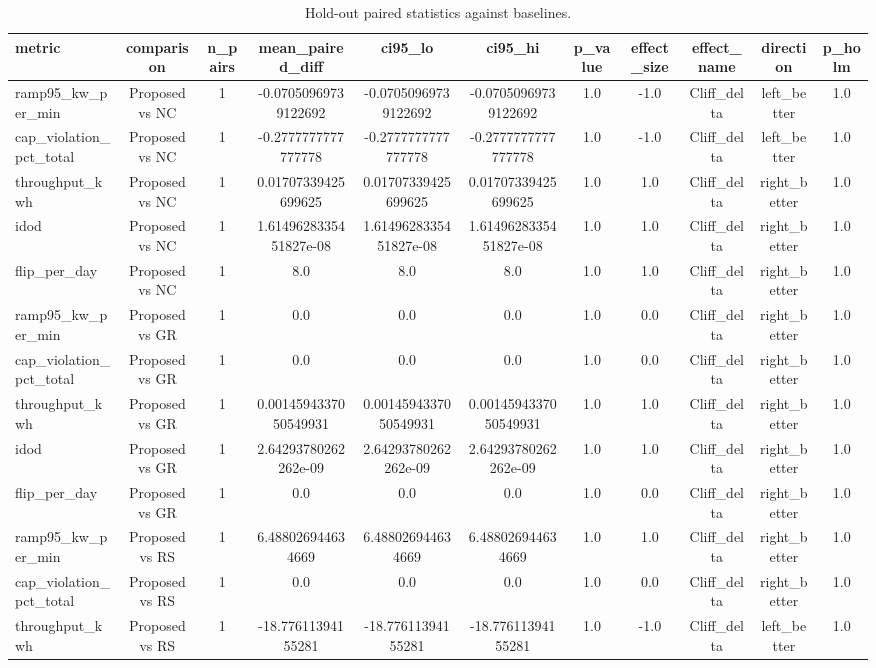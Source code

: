 \begin{table}[t]
\centering
\caption{Hold-out paired statistics against baselines.}
\label{tab:holdout_stats_auto}
\begin{tabular}{lcccccccccc}
\toprule
metric & comparison & n\_pairs & mean\_paired\_diff & ci95\_lo & ci95\_hi & p\_value & effect\_size & effect\_name & direction & p\_holm \\
\midrule
ramp95\_kw\_per\_min & Proposed vs NC & 1 & -0.07050969739122692 & -0.07050969739122692 & -0.07050969739122692 & 1.0 & -1.0 & Cliff\_delta & left\_better & 1.0 \\
cap\_violation\_pct\_total & Proposed vs NC & 1 & -0.2777777777777778 & -0.2777777777777778 & -0.2777777777777778 & 1.0 & -1.0 & Cliff\_delta & left\_better & 1.0 \\
throughput\_kwh & Proposed vs NC & 1 & 0.01707339425699625 & 0.01707339425699625 & 0.01707339425699625 & 1.0 & 1.0 & Cliff\_delta & right\_better & 1.0 \\
idod & Proposed vs NC & 1 & 1.6149628335451827e-08 & 1.6149628335451827e-08 & 1.6149628335451827e-08 & 1.0 & 1.0 & Cliff\_delta & right\_better & 1.0 \\
flip\_per\_day & Proposed vs NC & 1 & 8.0 & 8.0 & 8.0 & 1.0 & 1.0 & Cliff\_delta & right\_better & 1.0 \\
ramp95\_kw\_per\_min & Proposed vs GR & 1 & 0.0 & 0.0 & 0.0 & 1.0 & 0.0 & Cliff\_delta & right\_better & 1.0 \\
cap\_violation\_pct\_total & Proposed vs GR & 1 & 0.0 & 0.0 & 0.0 & 1.0 & 0.0 & Cliff\_delta & right\_better & 1.0 \\
throughput\_kwh & Proposed vs GR & 1 & 0.0014594337050549931 & 0.0014594337050549931 & 0.0014594337050549931 & 1.0 & 1.0 & Cliff\_delta & right\_better & 1.0 \\
idod & Proposed vs GR & 1 & 2.64293780262262e-09 & 2.64293780262262e-09 & 2.64293780262262e-09 & 1.0 & 1.0 & Cliff\_delta & right\_better & 1.0 \\
flip\_per\_day & Proposed vs GR & 1 & 0.0 & 0.0 & 0.0 & 1.0 & 0.0 & Cliff\_delta & right\_better & 1.0 \\
ramp95\_kw\_per\_min & Proposed vs RS & 1 & 6.488026944634669 & 6.488026944634669 & 6.488026944634669 & 1.0 & 1.0 & Cliff\_delta & right\_better & 1.0 \\
cap\_violation\_pct\_total & Proposed vs RS & 1 & 0.0 & 0.0 & 0.0 & 1.0 & 0.0 & Cliff\_delta & right\_better & 1.0 \\
throughput\_kwh & Proposed vs RS & 1 & -18.77611394155281 & -18.77611394155281 & -18.77611394155281 & 1.0 & -1.0 & Cliff\_delta & left\_better & 1.0 \\

\end{tabular}
\end{table}
